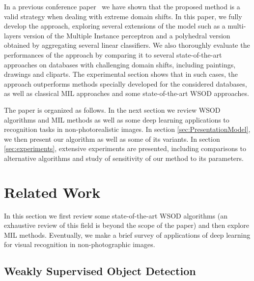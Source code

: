 \documentclass[preprint]{elsarticle}
\begin{document}
In a previous conference paper~\cite{gonthier_weakly_2018} we have shown that the proposed method is a valid strategy when dealing with extreme domain shifts. In this paper, we fully develop the approach, exploring several extensions of the model such as a multi-layers version of the Multiple Instance perceptron and a polyhedral version obtained by aggregating several linear classifiers.
We also thoroughly evaluate the performances of the approach by comparing it to several state-of-the-art approaches on databases with challenging domain shifts, including paintings, drawings and cliparts. The experimental section shows that in such cases, the approach outperforms methods specially developed for the considered databases, as well as classical MIL approaches and some state-of-the-art WSOD approaches.  












 The paper is organized as follows. In the next section we review WSOD algorithms and MIL methods as well as some deep learning applications to recognition tasks in non-photorealistic images. In section \ref{sec:PresentationModel}, we then present our algorithm as well as some of its variants. In section \ref{sec:experiments}, extensive experiments are presented, including comparisons to alternative algorithms and study of sensitivity of our method to its parameters. 
  












 












\section{Related Work}
In this section we first review some state-of-the-art WSOD algorithms (an exhaustive review of this field is beyond the scope of the paper) and then explore MIL methods. Eventually, we make a brief survey of applications of deep learning for visual recognition in non-photographic images. 

\subsection{Weakly Supervised Object Detection}
\label{sec:WSOD_relatedWork}
\end{document}
